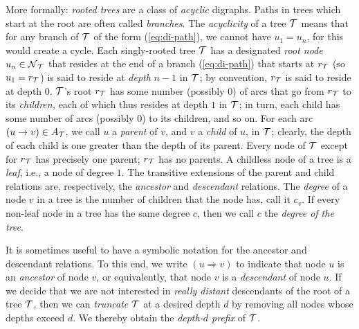 More formally: {\em rooted trees} are a class of {\em acyclic}
digraphs.  Paths in trees which start at the root are often called
{\em branches}.  The {\em acyclicity} of a tree $\mbox{$\cal T$}$ means that for
any branch of $\mbox{$\cal T$}$ of the form (\ref{eq:di-path}), we cannot have $u_1
= u_n$, for this would create a cycle.  Each singly-rooted tree $\mbox{$\cal T$}$
has a designated {\em root node}  $u_n \in
\mbox{$\cal N$}_{\mbox{{\scriptsize $\cal T$}}}$ that resides at the end of a branch (\ref{eq:di-path}) that
starts at $r_{\mbox{{\scriptsize $\cal T$}}}$ (so $u_1 = r_{\mbox{{\scriptsize $\cal T$}}}$) is said to reside at {\em
  depth} $n-1$ in $\mbox{$\cal T$}$; by convention, $r_{\mbox{{\scriptsize $\cal T$}}}$ is said to reside at
depth $0$.   $\mbox{$\cal T$}$'s
root $r_{\mbox{{\scriptsize $\cal T$}}}$ has some number (possibly $0$) of arcs that go from
$r_{\mbox{{\scriptsize $\cal T$}}}$ to its {\em children,} each of which thus resides at depth
$1$ in $\mbox{$\cal T$}$; in turn, each child has some number of arcs (possibly
$0$) to its children, and so on.  For each arc $(u \rightarrow v) \in
A_{\mbox{{\scriptsize $\cal T$}}}$, we call $u$ a {\it parent}  of $v$,
and $v$ a {\it child}  of $u$, in $\mbox{$\cal T$}$;
clearly, the depth of each child is one greater than the depth of its
parent.  Every node of $\mbox{$\cal T$}$ except for $r_{\mbox{{\scriptsize $\cal T$}}}$ has precisely one
parent; $r_{\mbox{{\scriptsize $\cal T$}}}$ has no parents.  A childless node of a tree is a
{\em leaf},  i.e., a node of degree $1$.  The
transitive extensions of the parent and child relations are,
respectively, the {\em ancestor}  and {\em
  descendant}  relations.  The {\em
  degree}  of a node $v$ in a tree
is the number of children that the node has, call it $c_v$.  If every
non-leaf node in a tree has the same degree $c$, then we call $c$ the
{\em degree of the tree}.  

It is sometimes useful to have a symbolic notation for the ancestor
and descendant relations.  To this end, we write $(u \Rightarrow v)$
 to
indicate that node $u$ is an {\it ancestor} of node $v$, or
equivalently, that node $v$ is a {\it descendant} of node $u$.  If we
decide that we are not interested in {\em really distant} descendants
of the root of a tree $\mbox{$\cal T$}$, then we can {\em truncate} 
$\mbox{$\cal T$}$ at a desired depth $d$ by removing all nodes whose depths exceed
$d$.  We thereby obtain the {\em depth-$d$ prefix} of $\mbox{$\cal T$}$.

